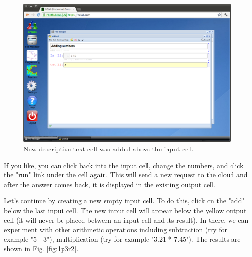 \documentclass[article,A4,12pt]{llncs}
\begin{document}
\begin{figure}[!ht]
\begin{center}
\includegraphics[width=\textwidth]{img/1p3r.png}
\end{center}
\caption{New descriptive text cell was added above the input cell.}
\label{fig:1p3r}
\end{figure}
\noindent
\noindent
If you like, you can click back into the input cell, change 
the numbers, and click the "run" link under the cell again. 
This will send a new request to the cloud and after the answer 
comes back, it is displayed in the existing output 
cell. 

Let's continue by creating a new empty input cell. To do this, click 
on the "add" below the last input cell. The new input cell will appear below the yellow 
output cell (it will never be placed between an input cell and its 
result). In there, we can experiment with other arithmetic operations 
including subtraction (try for example "5 - 3"), multiplication 
(try for example "3.21 * 7.45"). The results are shown in Fig. \ref{fig:1p3r2}.

\newpage
\end{document}
